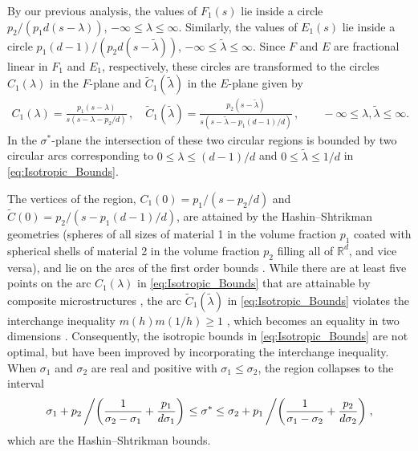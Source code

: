 \documentclass{cmslatex}
\begin{document}
By our previous analysis, the values of $F_1(s)$ lie inside a circle
$p_2/(p_1d(s-\lambda))$, $-\infty\leq\lambda\leq\infty$. Similarly, the values of $E_1(s)$ lie
inside a circle $p_1(d-1)/(p_2d(s-\tilde{\lambda}))$,
$-\infty\leq\tilde{\lambda}\leq\infty$. Since $F$ and $E$ are fractional linear in $F_1$ and
$E_1$, respectively, these circles are transformed to the circles
$C_1(\lambda)$ in the $F$-plane and $\tilde{C}_1(\tilde{\lambda})$ in the
$E$-plane given by \cite{Golden:JMPS-333}
%
\begin{align}\label{eq:Isotropic_Bounds}
  C_1(\lambda)=\frac{p_1(s-\lambda)}{s(s-\lambda-p_2/d)}\,, \quad  %
  \tilde{C}_1(\tilde{\lambda})=\frac{p_2(s-\tilde{\lambda})}{s(s-\tilde{\lambda}-p_1(d-1)/d)}\,,
   \qquad -\infty\leq\lambda,\tilde{\lambda}\leq\infty. %
\end{align}
%
In the $\sigma^*$-plane the intersection of these two circular regions is
bounded by two circular arcs \cite{Golden:JMPS-333} corresponding to
$0\leq\lambda\leq(d-1)/d$ and $0\leq\tilde{\lambda}\leq1/d$ in \eqref{eq:Isotropic_Bounds}.




The vertices of the region,
$C_1(0)=p_1/(s-p_2/d)$ and $\tilde{C}(0)=p_2/(s-p_1(d-1)/d)$, are
attained by the Hashin--Shtrikman geometries (spheres of all
sizes of material 1 in the volume fraction $p_1$ coated with spherical
shells of material 2 in the volume fraction $p_2$ filling all of
$\mathbb{R}^d$, and vice versa), and lie on the arcs of the first
order bounds \cite{Golden:JMPS-333}. While there are at least five
points on the arc $C_1(\lambda)$ in \eqref{eq:Isotropic_Bounds} that are
attainable by composite microstructures \cite{Milton:JAP-5286}, the
arc $\tilde{C}_1(\tilde{\lambda})$ in \eqref{eq:Isotropic_Bounds} violates
\cite{Golden:JMPS-333} the interchange inequality $m(h)m(1/h)\geq1$
\cite{Keller:1964:TCC,Schulgasser:1976:CFR}, which becomes an equality
in two dimensions \cite{MILTON:2002:TC}.  Consequently, the isotropic
bounds in \eqref{eq:Isotropic_Bounds} are not optimal, but have been
improved \cite{Milton:APL-300,Bergman:AP-78} by incorporating the
interchange inequality. When $\sigma_1$ and $\sigma_2$ are real and positive
with $\sigma_1\leq\sigma_2$, the region collapses to the interval
%
\begin{align}
  \sigma_1+p_2\left/  \left(\frac{1}{\sigma_2-\sigma_1}+\frac{p_1}{d\sigma_1}\right)\right.
  \leq\sigma^*\leq 
  \sigma_2+p_1\left/  \left(\frac{1}{\sigma_1-\sigma_2}+\frac{p_2}{d\sigma_2}\right)\right.,
\end{align}
%
which are the Hashin--Shtrikman bounds.
\end{document}

